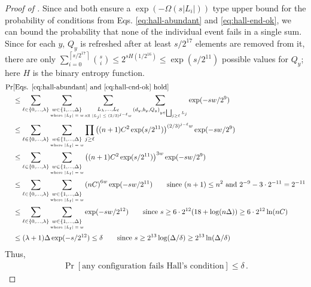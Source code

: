 \documentclass[10pt]{article}
\theoremstyle{definition}\newtheorem{definition}[lemma]{Definition}
\theoremstyle{remark}  \newtheorem*{remark}{Remark}
\newcommand{\ceil}[1]{{\left\lceil{#1}\right\rceil}}
\newcommand{\mscomment}[1]{%
  \marginpar{\color{BrickRed}!!!}[{\color{BrickRed}\bf MS: #1}]}
\begin{document}
\begin{proof}[Proof of ]
  Since   and  both ensure a $\exp( - \Omega(s |L_i|))$ type upper bound for the probability of conditions from Eqs. \ref{eq:hall-abundant} and \ref{eq:hall-end-ok}, we can bound the probability that none of the individual event fails in a single sum. Since for each $y$, $Q_y$ is refreshed after at least $s/2^{17}$ elements are removed from it, there are only $\sum_{i=0}^{\ceil{s/2^{17}}} \binom{s}{i} \le 2^{s H(1/2^{16})} \le \exp(s / 2^{11})$ possible values for $Q_y$; here $H$ is the binary entropy function.
  \begin{align*}
    \Pr &[\text{Eqs. \ref{eq:hall-abundant} and \ref{eq:hall-end-ok} hold}]  \\
      &\le \sum_{\ell \in \{0,\ldots,\lambda\}} \sum_{\underset{\text{where $|L_\ell| = w$}}{w \in \{1,\ldots,\Delta\}}} \sum_{\underset{\text{all $|L_j| \le (2/3)^{j - \ell} w$}}{L_\lambda,\ldots,L_\ell}} \sum_{(d_y,b_y,Q_y)_{y \in \bigsqcup_{j \ge \ell} L_j}} \exp(-  s w / 2^9) \\
      &\le \sum_{\ell \in \{0,\ldots,\lambda\}} \sum_{\underset{\text{where $|L_\ell| = w$}}{w \in \{1,\ldots,\Delta\}}} \prod_{j \ge \ell} \left((n+1) C^2 \exp(s/2^{11})\right)^{(2/3)^{j - \ell} w} \exp(-  s w / 2^9) \\
      &\le \sum_{\ell \in \{0,\ldots,\lambda\}} \sum_{\underset{\text{where $|L_\ell| = w$}}{w \in \{1,\ldots,\Delta\}}} \left((n+1) C^2 \exp(s / 2^{11}) \right)^{3 w} \exp(- s w / 2^9)  \\ 
      &\le \sum_{\ell \in \{0,\ldots,\lambda\}} \sum_{\underset{\text{where $|L_\ell| = w$}}{w \in \{1,\ldots,\Delta\}}} \left(n C\right)^{6 w} \exp(- s w / 2^{11}) \qquad  \text{since $(n+1) \le n^2$ and $2^{-9} - 3 \cdot 2^{-11} = 2^{-11}$} \\ 
      &\le \sum_{\ell \in \{0,\ldots,\lambda\}} \sum_{\underset{\text{where $|L_\ell| = w$}}{w \in \{1,\ldots,\Delta\}}} \exp(- s w / 2^{12}) \qquad \text{since $s \ge 6 \cdot 2^{12} (18 + \log(n \Delta)) \ge 6 \cdot 2^{12} \ln(n C)$} \\
      &\le (\lambda + 1) \Delta \exp(-s / 2^{12}) \le \delta \qquad \text{since $s \ge 2^{13} \log(\Delta/\delta) \ge 2^{13} \ln(\Delta/\delta)$}
  \end{align*}
  Thus,
  \begin{align*}
    \Pr[\text{any configuration fails Hall's condition}]  \le \delta \,.
  \end{align*}
%   

\end{proof}
\end{document}

